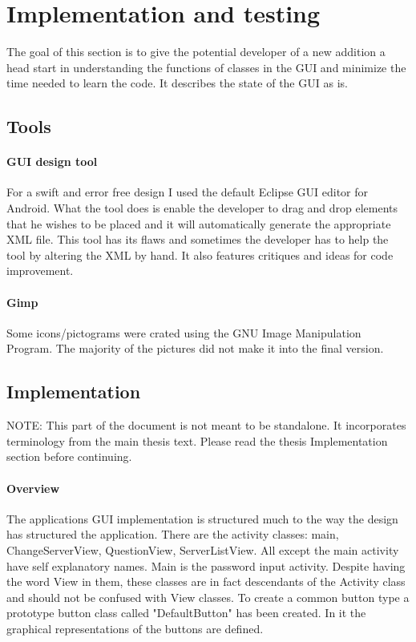 \documentclass[11pt]{article} %
\begin{document}
\section{Implementation and testing}
The goal of this section is to give the potential developer of a new addition a head start in understanding the functions of classes in the GUI and minimize the time needed to learn the code. It describes the state of the GUI as is.
\subsection{Tools}
\paragraph{GUI design tool}
For a swift and error free design I used the default Eclipse GUI editor for Android. What the tool does is enable the developer to drag and drop elements that he wishes to be placed and it will automatically generate the appropriate XML file. This tool has its flaws and sometimes the developer has to help the tool by altering the XML by hand. It also features critiques and ideas for code improvement.
\paragraph{Gimp}
Some icons/pictograms were crated using the GNU Image Manipulation Program. The majority of the pictures did not make it into the final version.
\subsection{Implementation}
NOTE: This part of the document is not meant to be standalone. It incorporates terminology from the main thesis text. Please read the thesis Implementation section before continuing.
\paragraph{Overview}
The applications GUI implementation is structured much to the way the design has structured the application. There are the activity classes: main, ChangeServerView, QuestionView, ServerListView. All except the main activity have self explanatory names. Main is the password input activity. Despite having the word View in them, these classes are in fact descendants of the Activity class and should not be confused with View classes. To create a common button type a prototype button class called "DefaultButton" has been created. In it the graphical representations of the buttons are defined.
\end{document}
